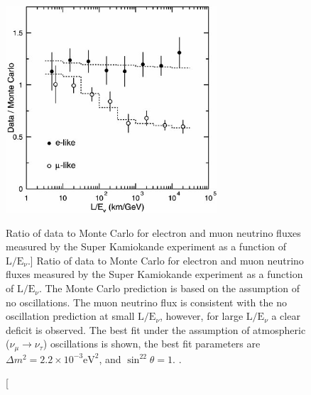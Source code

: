 \begin{figure}

	\centering

	\includegraphics[width=0.7\textwidth]{figures/sk_flux.jpg}

	\caption
	[Ratio of data to Monte Carlo for electron and muon neutrino fluxes 
	measured by the Super Kamiokande experiment as a function of 
	\(\mbox{L} / \mbox{E}_\nu\).]
	{Ratio of data to Monte Carlo for electron and muon neutrino fluxes measured 
	by the Super Kamiokande experiment as a function of 
	\(\mbox{L} / \mbox{E}_\nu\). The Monte Carlo prediction is based on the
	assumption of no oscillations. The muon neutrino flux is consistent with the
	no oscillation prediction at small \(\mbox{L} / \mbox{E}_\nu\), however, for
	large \(\mbox{L} / \mbox{E}_\nu\) a clear deficit is observed. The best fit
	under the assumption of atmospheric (\(\nu_\mu \rightarrow \nu_\tau\))
	oscillations is shown, the best fit parameters are \(\Delta m^2 = 2.2 \times
	10^{-3} \mbox{eV}^2\), and \(\sin^22\theta = 1\). \cite{Fukuda1998}.}

	\label{fig:sk_flux}

\end{figure}

